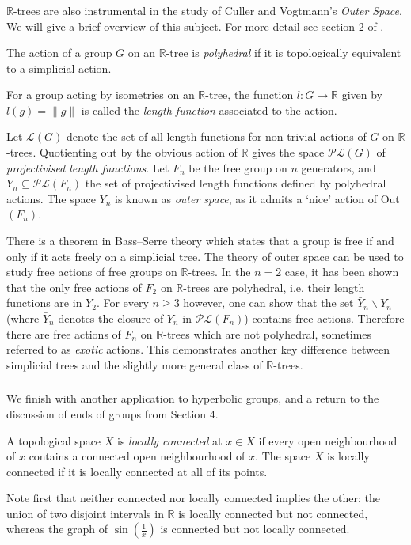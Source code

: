 \subsubsection{}
$\mathbb{R}$-trees are also instrumental in the study of Culler and Vogtmann's \textit{Outer Space}. We will give a brief overview of this subject. For more detail see section 2 of \cite{Shalen}.

\begin{definition}
    The action of a group $G$ on an $\mathbb{R}$-tree is \emph{polyhedral} if it is topologically equivalent to a simplicial action.
\end{definition}
\begin{definition}
    For a group acting by isometries on an $\mathbb{R}$-tree, the function $l:G\rightarrow\mathbb{R}$ given by $l(g)=\lVert g\rVert$ is called the \emph{length function} associated to the action.
\end{definition}

Let $\mathcal{L}(G)$ denote the set of all length functions for non-trivial actions of $G$ on $\mathbb{R}$-trees. Quotienting out by the obvious action of $\mathbb{R}$ gives the space $\mathcal{PL}(G)$ of \textit{projectivised length functions}. Let $F_n$ be the free group on $n$ generators, and $Y_n\subseteq \mathcal{PL}(F_n)$ the set of projectivised length functions defined by polyhedral actions. The space $Y_n$ is known as \textit{outer space}, as it admits a `nice' action of Out$(F_n)$. 

There is a theorem in Bass--Serre theory which states that a group is free if and only if it acts freely on a simplicial tree. The theory of outer space can be used to study free actions of free groups on $\mathbb{R}$-trees. In the $n=2$ case, it has been shown that the only free actions of $F_2$ on $\mathbb{R}$-trees are polyhedral, i.e. their length functions are in $Y_2$. For every $n\geq 3$ however, one can show that the set $\bar{Y}_n\backslash Y_n$ (where $\bar{Y}_n$ denotes the closure of $Y_n$ in $\mathcal{PL}(F_n)$) contains free actions. Therefore there are free actions of $F_n$ on $\mathbb{R}$-trees which are not polyhedral, sometimes referred to as \textit{exotic} actions. This demonstrates another key difference between simplicial trees and the slightly more general class of $\mathbb{R}$-trees.

\subsubsection{}
We finish with another application to hyperbolic groups, and a return to the discussion of ends of groups from Section 4.
\begin{definition}
    A topological space $X$ is \emph{locally connected} at $x\in X$ if every open neighbourhood of $x$ contains a connected open neighbourhood of $x$. The space $X$ is locally connected if it is locally connected at all of its points.
\end{definition}
Note first that neither connected nor locally connected implies the other: the union of two disjoint intervals in $\mathbb{R}$ is locally connected but not connected, whereas the graph of $\sin(\frac{1}{x})$ is connected but not locally connected.

